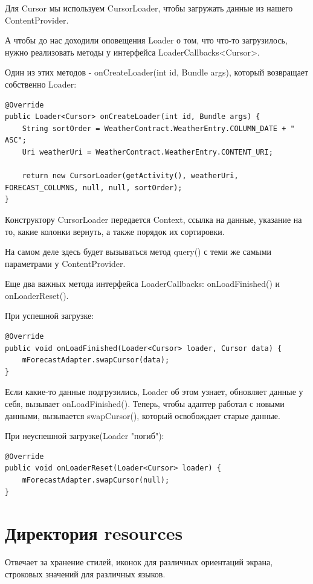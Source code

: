 \documentclass[12 pt]{article}
\begin{document}
    Для Cursor мы используем CursorLoader, чтобы загружать данные из нашего ContentProvider.
    
    А чтобы до нас доходили оповещения Loader о том, что что-то загрузилось, нужно реализовать методы у интерфейса LoaderCallbacks<Cursor>.
    
    Один из этих методов - onCreateLoader(int id, Bundle args), который возвращает собственно Loader:
    
    \begin{lstlisting}
@Override
public Loader<Cursor> onCreateLoader(int id, Bundle args) {
	String sortOrder = WeatherContract.WeatherEntry.COLUMN_DATE + " ASC";
	Uri weatherUri = WeatherContract.WeatherEntry.CONTENT_URI;

	return new CursorLoader(getActivity(), weatherUri, FORECAST_COLUMNS, null, null, sortOrder);
}
    \end{lstlisting}

Конструктору CursorLoader передается Context, ссылка на данные, указание на то, какие колонки вернуть, а также порядок их сортировки.

На самом деле здесь будет вызываться метод query() с теми же самыми параметрами у ContentProvider.

Еще два важных метода интерфейса LoaderCallbacks: onLoadFinished() и onLoaderReset().

При успешной загрузке:

	\begin{lstlisting}
@Override
public void onLoadFinished(Loader<Cursor> loader, Cursor data) {
	mForecastAdapter.swapCursor(data);
}
    \end{lstlisting}
Если какие-то данные подгрузились, Loader об этом узнает, обновляет данные у себя, вызывает onLoadFinished(). Теперь, чтобы адаптер работал с новыми данными, вызывается swapCursor(), который освобождает старые данные.    

При неуспешной загрузке(Loader "погиб"):

	\begin{lstlisting}
@Override
public void onLoaderReset(Loader<Cursor> loader) {
	mForecastAdapter.swapCursor(null);
}
    \end{lstlisting}

\section{Директория resources}
Отвечает за хранение стилей, иконок для различных ориентаций экрана, строковых значений для различных языков.
\end{document}
